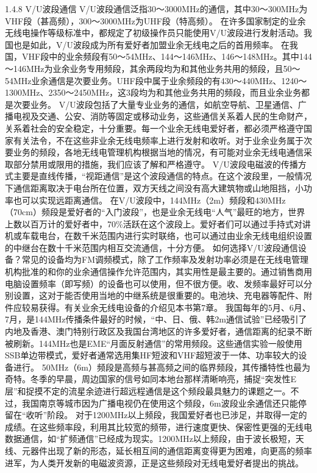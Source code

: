 \documentclass[12pt,UTF8]{ctexbook}
\begin{document}
1.4.8 V/U波段通信
V/U波段通信泛指30～3000MHz的通信，其中30～300MHz为VHF段（甚高频），300～3000MHz为UHF段（特高频）。
在许多国家制定的业余无线电操作等级标准中，都规定了初级操作员只能使用V/U波段进行发射活动。我国也是如此，V/U波段成为所有爱好者加盟业余无线电之后的首用频率。
在我国，VHF段中的业余频段有50～54MHz、144～146MHz、146～148MHz。其中144～146MHz为业余业务专用频段，其余两段均为和其他业务共用的频段，且50～54MHz业余通信是次要业务。UHF段中属于业余频段的有430～440MHz、1240～1300MHz、2350～2450MHz，这3段均为和其他业务共用的频段，而且业余业务都是次要业务。
V/U波段包括了大量专业业务的通信，如航空导航、卫星通信、广播电视及交通、公安、消防等固定或移动业务，这些通信关系着人民的生命财产，关系着社会的安全稳定，十分重要。每一个业余无线电爱好者，都必须严格遵守国家有关法令，不在这些非业余无线电频率上进行发射和收听。对于业余业务属于次要业务的频段，各地无线电管理机构根据当地的情况，有可能对业余无线电通信采取部分禁用或限用的措施，我们应该了解和严格遵守。
V/U波段电磁波的传播方式主要是直线传播，“视距通信”是这个波段通信的特点。在这个波段里，一般情况下通信距离取决于电台所在位置，双方天线之间没有高大建筑物或山地阻挡，小功率也可以实现远距离通信。
在V/U波段中，144MHz（2m）频段和430MHz（70cm）频段是爱好者的“入门波段”，也是业余无线电“人气”最旺的地方，世界上数以百万计的爱好者中，70\%活跃在这个波段上。爱好者们可以通过手持式对讲机或车载电台，在数千米范围内进行实时联络，也可以通过由业余无线电组织设置的中继台在数十千米范围内相互交流通信，十分方便。
如何选择V/U波段通信设备？常见的设备均为FM调频模式，除了工作频率及发射功率必须是在无线电管理机构批准的和你的业余通信操作允许范围内，其实用性是最主要的。通过销售商用电脑设置频率（即写频）的设备也可以使用，但不很方便。收、发频率最好可以分别设置，这对于能否使用当地的中继系统是很重要的。电池块、充电器等配件、附件应较易获得。有关业余无线电设备的介绍见本书第7章。
我国每年的5月、6月、7月，是144MHz传播条件最好的时候，“中、日、俄、韩2m通信试验”已经吸引了内地及香港、澳门特别行政区及我国台湾地区的许多爱好者，通信距离的纪录不断被刷新。144MHz也是EME“月面反射通信”的常用频段。这些通信实验一般使用SSB单边带模式，爱好者通常选用集HF短波和VHF超短波于一体、功率较大的设备进行。
50MHz（6m）频段是高频与甚高频之间的临界频段，其传播特性也最为奇特。冬季的早晨，周边国家的信号如同本地台那样清晰响亮，捕捉“突发性E层”和捉摸不定的流星余迹进行超远程通信是这个频段最具魅力的课题之一。不过，我国南京等城市因为广播电视仍在使用这个频段，6m波段业余通信还只能停留在“收听”阶段。
对于1200MHz以上频段，我国爱好者也已涉足，并取得一定的成绩。在这些频率段，利用其比较宽的频带，进行速度更快、保密性更强的无线电数据通信，如“扩频通信”已经成为现实。1200MHz以上频段，由于波长极短，天线、元器件出现了新的形态，延长相互间的通信距离变得更为困难，向更高的频率进军，为人类开发新的电磁波资源，正是这些频段对无线电爱好者提出的挑战。
\end{document}
